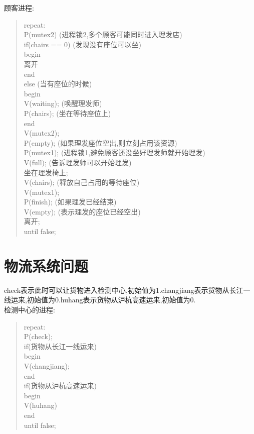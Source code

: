 \documentclass[a4paper,12pt,notitlepage]{article}
\begin{document}
	顾客进程:
	
\begin{quote}
repeat: \\
	P(mutex2) (进程锁2,多个顾客可能同时进入理发店) \\
	if(chairs == 0) (发现没有座位可以坐) \\
	begin \\
	离开 \\
	end \\
	else (当有座位的时候) \\
	begin \\
	V(waiting); (唤醒理发师) \\
	P(chairs); (坐在等待座位上) \\
	end \\
	V(mutex2); \\
	P(empty); (如果理发座位空出,则立刻占用该资源) \\
	P(mutex1); (进程锁1,避免顾客还没坐好理发师就开始理发) \\
	V(full); (告诉理发师可以开始理发) \\
	坐在理发椅上; \\
	V(chairs); (释放自己占用的等待座位) \\
	V(mutex1); \\
	P(finish); (如果理发已经结束) \\
	V(empty); (表示理发的座位已经空出) \\
	离开; \\
until false;
\end{quote}

\section{物流系统问题}

	check表示此时可以让货物进入检测中心,初始值为1.changjiang表示货物从长江一线运来,初始值为0.huhang表示货物从沪杭高速运来,初始值为0. \\
	
	检测中心的进程: \\
	
\begin{quote}
	repeat: \\
	P(check); \\
	if(货物从长江一线运来) \\
	begin \\
	V(changjiang); \\
	end \\
	if(货物从沪杭高速运来) \\
	begin \\
	V(huhang) \\
	end \\
	until false;
\end{quote}
\end{document}
